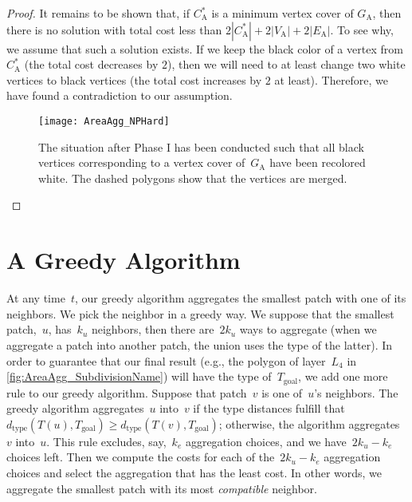 \begin{proof}
It remains to be shown that, 
if $C_\mathrm{A}^*$ is a minimum vertex cover of $G_\mathrm{A}$, 
then there is no solution with total cost 
less than $2|C_\mathrm{A}^*|+2|V_\mathrm{A}|+2|E_\mathrm{A}|$.
To see why, we assume that such a solution exists.
If we keep the black color of a vertex from $C_\mathrm{A}^*$ 
(the total cost decreases by $2$),
then we will need to at least change two white vertices
to black vertices
(the total cost increases by $2$ at least).
Therefore, we have found a contradiction to our assumption.

\begin{figure}[tb]
\centering
\texttt{[image: AreaAgg\_NPHard]}
\caption{The situation after Phase I has been conducted 
    such that all black vertices corresponding to a vertex cover 
    of~$G_\mathrm{A}$ have been recolored white.
    The dashed polygons show that the vertices are merged.}
\label{fig:reduction2}
\end{figure}
\end{proof}

\section{A Greedy Algorithm}
\label{sec:AreaAgg_Greedy}


At any time~$t$,
our greedy algorithm aggregates the smallest patch
with one of its neighbors.
We pick the neighbor in a greedy way.
We suppose that the smallest patch,~$u$, has~$k_u$ neighbors,
then there are~$2k_u$ ways to aggregate
(when we aggregate a patch into another patch,
the union uses the type of the latter).
In order to guarantee that our final result
(e.g., the polygon of layer~$L_4$ in 
\fig\ref{fig:AreaAgg_SubdivisionName})
will have the type of~$T_\mathrm{goal}$,
we add one more rule to our greedy algorithm.
Suppose that patch~$v$ is one of~$u$'s neighbors.
The greedy algorithm aggregates~$u$ into~$v$ 
if the type distances fulfill that
$d_\mathrm{type}\left(T(u), T_\mathrm{goal}\right) 
\ge d_\mathrm{type}\left(T(v), T_\mathrm{goal}\right)$;
otherwise, the algorithm aggregates~$v$ into~$u$.
This rule excludes, say,~$k_e$ aggregation choices,
and we have~$2k_u - k_e$ choices left.
Then we compute the costs for each of 
the~$2k_u - k_e$ aggregation choices
and select the aggregation that has the least cost.
In other words, we aggregate the smallest patch with 
its most \emph{compatible} neighbor.

